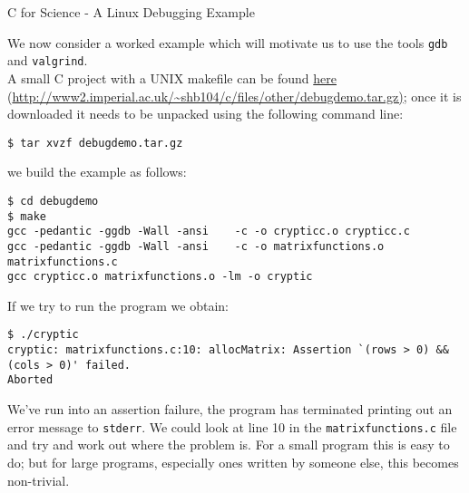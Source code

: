 \documentclass[a4paper,12pt]{article}
\begin{document}
\begin{center}
\large C for Science - A Linux Debugging Example
\end{center}
We now consider a worked example which will motivate us to use the tools {\tt gdb} and {\tt valgrind}.\\
A small C project with a UNIX makefile can be found \href{http://www2.imperial.ac.uk/~shb104/c/files/other/debugdemo.tar.gz}{here} (\url{http://www2.imperial.ac.uk/~shb104/c/files/other/debugdemo.tar.gz)}; once it is downloaded it needs to be unpacked using the following command line:
\begin{verbatim}
$ tar xvzf debugdemo.tar.gz
\end{verbatim} 
we build the example as follows:
\begin{verbatim}
$ cd debugdemo
$ make
gcc -pedantic -ggdb -Wall -ansi    -c -o crypticc.o crypticc.c
gcc -pedantic -ggdb -Wall -ansi    -c -o matrixfunctions.o matrixfunctions.c
gcc crypticc.o matrixfunctions.o -lm -o cryptic
\end{verbatim}
If we try to run the program we obtain:
\begin{verbatim}
$ ./cryptic 
cryptic: matrixfunctions.c:10: allocMatrix: Assertion `(rows > 0) && (cols > 0)' failed.
Aborted
\end{verbatim}
We've run into an assertion failure, the program has terminated printing out an error message to {\tt stderr}. We could look at line 10 in the {\tt matrixfunctions.c} file and try and work out where the problem is. For a small program this is easy to do; but for large programs, especially ones written by someone else, this becomes non-trivial.
\end{document}
